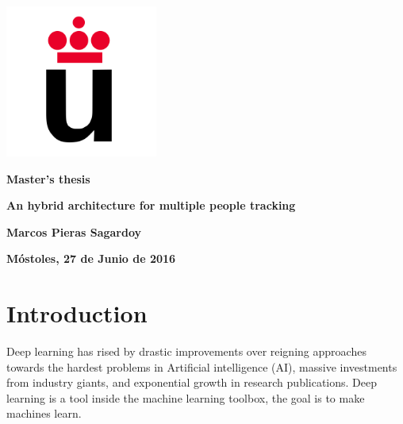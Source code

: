 \documentclass[12pt, a4paper, titlepage,twoside,openright]{article}
\begin{document}
	

\begin{titlepage}
\centering		
\includegraphics[width=5cm]{Logo_URJC.png}


\vspace{1cm}

\begin{center}
	
	\Large{\textbf{Master's thesis}}
	
	
	\vspace{4cm}
	
	\Huge
	\textbf{An hybrid architecture for multiple people tracking}
		
	
\end{center}

\vspace{6.2cm}

\begin{flushright}
	
\large


\textbf{Marcos Pieras Sagardoy}

\vspace{1.4cm}
	
\normalsize
\textbf{Móstoles, 27 de Junio de 2016}
	
	
\end{flushright}


\end{titlepage}


\tableofcontents

\clearpage



\section{Introduction}

Deep learning has rised by drastic improvements over reigning approaches towards the hardest problems in Artificial intelligence (AI), massive investments from industry giants, and exponential growth in research publications. Deep learning is a tool inside the machine learning toolbox, the goal is to make machines learn.
\end{document}
